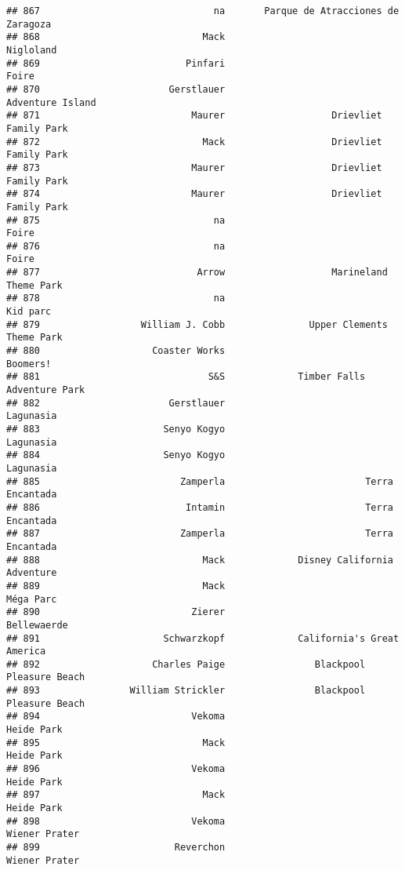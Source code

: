 \documentclass[
]{article}
\begin{document}
\begin{verbatim}
## 867                               na       Parque de Atracciones de Zaragoza
## 868                             Mack                               Nigloland
## 869                          Pinfari                                   Foire
## 870                       Gerstlauer                        Adventure Island
## 871                           Maurer                   Drievliet Family Park
## 872                             Mack                   Drievliet Family Park
## 873                           Maurer                   Drievliet Family Park
## 874                           Maurer                   Drievliet Family Park
## 875                               na                                   Foire
## 876                               na                                   Foire
## 877                            Arrow                   Marineland Theme Park
## 878                               na                                Kid parc
## 879                  William J. Cobb               Upper Clements Theme Park
## 880                    Coaster Works                                Boomers!
## 881                              S&S             Timber Falls Adventure Park
## 882                       Gerstlauer                               Lagunasia
## 883                      Senyo Kogyo                               Lagunasia
## 884                      Senyo Kogyo                               Lagunasia
## 885                         Zamperla                         Terra Encantada
## 886                          Intamin                         Terra Encantada
## 887                         Zamperla                         Terra Encantada
## 888                             Mack             Disney California Adventure
## 889                             Mack                               Méga Parc
## 890                           Zierer                             Bellewaerde
## 891                      Schwarzkopf             California's Great America 
## 892                    Charles Paige                Blackpool Pleasure Beach
## 893                William Strickler                Blackpool Pleasure Beach
## 894                           Vekoma                              Heide Park
## 895                             Mack                              Heide Park
## 896                           Vekoma                              Heide Park
## 897                             Mack                              Heide Park
## 898                           Vekoma                           Wiener Prater
## 899                        Reverchon                           Wiener Prater

\end{verbatim}
\end{document}
